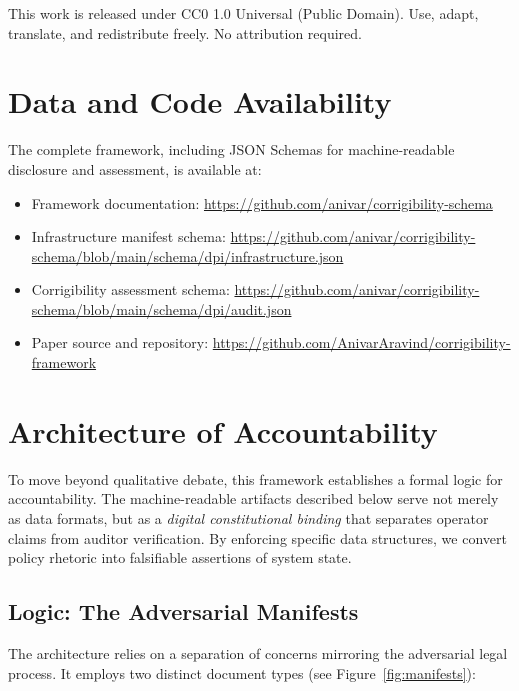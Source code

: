 \documentclass{article}
\begin{document}
This work is released under CC0 1.0 Universal (Public Domain). Use, adapt, translate, and redistribute freely. No attribution required.

\section*{Data and Code Availability}

The complete framework, including JSON Schemas for machine-readable disclosure and assessment, is available at:

\begin{itemize}
    \item Framework documentation: \url{https://github.com/anivar/corrigibility-schema}
    \item Infrastructure manifest schema: \url{https://github.com/anivar/corrigibility-schema/blob/main/schema/dpi/infrastructure.json}
    \item Corrigibility assessment schema: \url{https://github.com/anivar/corrigibility-schema/blob/main/schema/dpi/audit.json}
    \item Paper source and repository: \url{https://github.com/AnivarAravind/corrigibility-framework}
\end{itemize}

\appendix

\section{Architecture of Accountability}
\label{appendix:architecture}

To move beyond qualitative debate, this framework establishes a formal logic for accountability. The machine-readable artifacts described below serve not merely as data formats, but as a \textit{digital constitutional binding} that separates operator claims from auditor verification. By enforcing specific data structures, we convert policy rhetoric into falsifiable assertions of system state.

\subsection{Logic: The Adversarial Manifests}

The architecture relies on a separation of concerns mirroring the adversarial legal process. It employs two distinct document types (see Figure~\ref{fig:manifests}):
\end{document}
